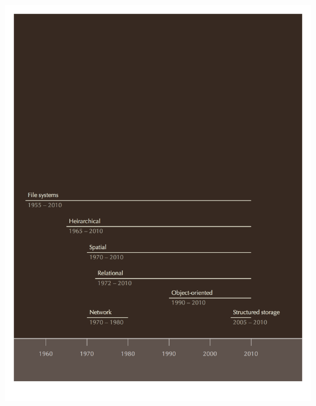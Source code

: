 \documentclass[
]{article}
\begin{document}
\includegraphics{Figures/Chapter 1/timeline2.png}
\end{document}

